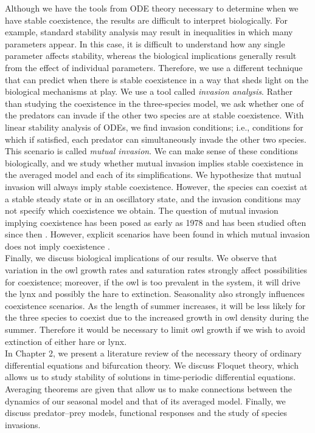 \documentclass[12pt]{UOthesis}
\theoremstyle{remarkstyle}
\begin{document}
Although we have the tools from ODE theory necessary to determine when we have stable coexistence, the results are difficult to interpret biologically. For example, standard stability analysis may result in inequalities in which many parameters appear. In this case, it is difficult to understand how any single parameter affects stability, whereas the biological implications generally result from the effect of individual parameters. Therefore, we use a different technique that can predict when there is stable coexistence in a way that sheds light on the biological mechanisms at play. We use a tool called \textit{invasion analysis}. Rather than studying the coexistence in the three-species model, we ask whether one of the predators can invade if the other two species are at stable coexistence. With linear stability analysis of ODEs, we find invasion conditions; i.e., conditions for which if satisfied, each predator can simultaneously invade the other two species. This scenario is called \textit{mutual invasion}. We can make sense of these conditions biologically, and we study whether mutual invasion implies stable coexistence in the averaged model and each of its simplifications. We hypothesize that mutual invasion will always imply stable coexistence. However, the species can coexist at a stable steady state or in an oscillatory state, and the invasion conditions may not specify which coexistence we obtain. The question of mutual invasion implying coexistence has been posed as early as 1978 \cite{Turelli1} and has been studied often since then \cite{ChessonEllner, Turelli2, SamiaLutscher}. However, explicit scenarios have been found in which mutual invasion does not imply coexistence \cite{Chesson, SzilagyiMeszena}.\\

Finally, we discuss biological implications of our results. We observe that variation in the owl growth rates and saturation rates strongly affect possibilities for coexistence; moreover, if the owl is too prevalent in the system, it will drive the lynx and possibly the hare to extinction. Seasonality also strongly influences coexistence scenarios. As the length of summer increases, it will be less likely for the three species to coexist due to the increased growth in owl density during the summer.  Therefore it would be necessary to limit owl growth if we wish to avoid extinction of either hare or lynx.\\

In Chapter 2, we present a literature review of the necessary theory of ordinary differential equations and bifurcation theory. We discuss Floquet theory, which allows us to study stability of solutions in time-periodic differential equations. Averaging theorems are given that allow us to make connections between the dynamics of our seasonal model and that of its averaged model. Finally, we discuss predator--prey models, functional responses and the study of species invasions.\\
\end{document}
